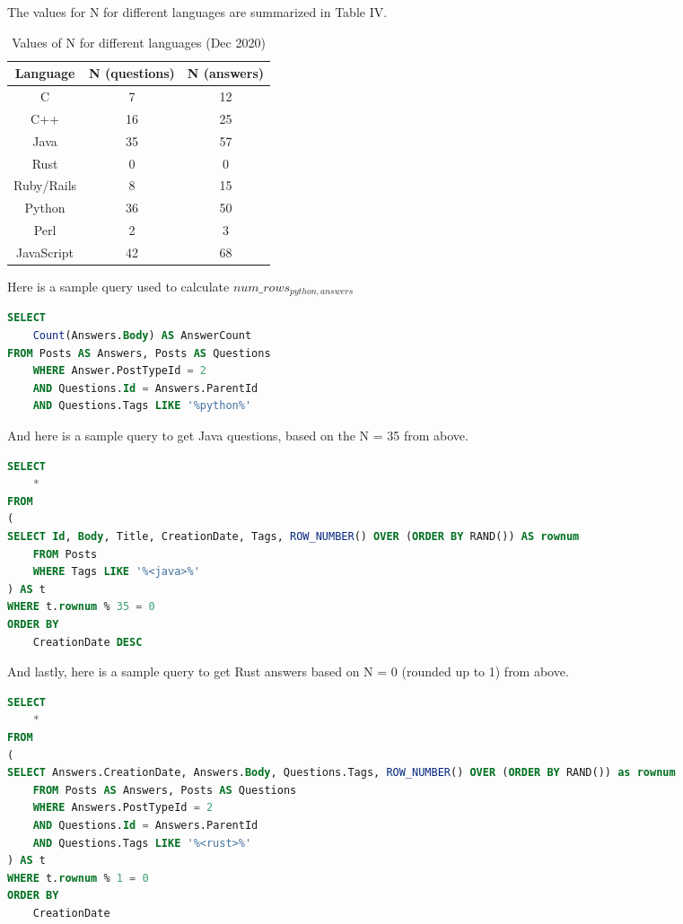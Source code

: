 \documentclass[conference]{IEEEtran}
\begin{document}
The values for N for different languages are summarized in Table IV.
\begin{table}[htbp]
\caption{Values of N for different languages (Dec 2020)}
\begin{center}
\begin{tabular}{|c|c|c|}
\hline
\textbf{Language}&\textbf{N (questions)}& \textbf{N (answers)}\\
\hline
C&7&12\\
\hline
C++&16&25\\
\hline
Java&35&57\\
\hline
Rust&0&0\\
\hline
Ruby/Rails&8&15\\
\hline
Python&36&50\\
\hline
Perl&2&3\\
\hline
JavaScript&42&68\\
\hline
\end{tabular}
\label{tab1}
\end{center}
\end{table}

Here is a sample query used to calculate $num\_rows_{python, answers}$

\begin{lstlisting}[language=SQL]
SELECT
    Count(Answers.Body) AS AnswerCount
FROM Posts AS Answers, Posts AS Questions
    WHERE Answer.PostTypeId = 2
    AND Questions.Id = Answers.ParentId
    AND Questions.Tags LIKE '%python%'
\end{lstlisting}

And here is a sample query to get Java questions, based on the N = 35 from above.
\begin{lstlisting}[language=SQL]
SELECT
    *
FROM
(
SELECT Id, Body, Title, CreationDate, Tags, ROW_NUMBER() OVER (ORDER BY RAND()) AS rownum
    FROM Posts
    WHERE Tags LIKE '%<java>%'
) AS t
WHERE t.rownum % 35 = 0
ORDER BY
    CreationDate DESC
\end{lstlisting}

And lastly, here is a sample query to get Rust answers based on N = 0 (rounded up to 1) from above.
\begin{lstlisting}[language=SQL]
SELECT
    *
FROM
(
SELECT Answers.CreationDate, Answers.Body, Questions.Tags, ROW_NUMBER() OVER (ORDER BY RAND()) as rownum
    FROM Posts AS Answers, Posts AS Questions
    WHERE Answers.PostTypeId = 2
    AND Questions.Id = Answers.ParentId
    AND Questions.Tags LIKE '%<rust>%'
) AS t
WHERE t.rownum % 1 = 0
ORDER BY
    CreationDate
\end{lstlisting}
\end{document}
